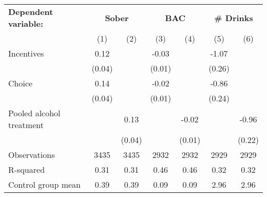 \begin{tabular}{l c c c c c c} \toprule \textbf{Dependent variable:} & \multicolumn{2}{c}{\textbf{Sober}} & \multicolumn{2}{c}{\textbf{BAC}} & \multicolumn{2}{c}{\textbf{\# Drinks}} \\ \cmidrule(lr){2-3} \cmidrule(lr){4-5} \cmidrule(lr){6-7}&\multicolumn{1}{c}{(1)}&\multicolumn{1}{c}{(2)}&\multicolumn{1}{c}{(3)}&\multicolumn{1}{c}{(4)}&\multicolumn{1}{c}{(5)}&\multicolumn{1}{c}{(6)}\\
\midrule
Incentives          &        0.12&            &       -0.03&            &       -1.07&            \\
                    &      (0.04)&            &      (0.01)&            &      (0.26)&            \\
\addlinespace
Choice              &        0.14&            &       -0.02&            &       -0.86&            \\
                    &      (0.04)&            &      (0.01)&            &      (0.24)&            \\
\addlinespace
Pooled alcohol treatment&            &        0.13&            &       -0.02&            &       -0.96\\
                    &            &      (0.04)&            &      (0.01)&            &      (0.22)\\
\midrule
Observations        &        3435&        3435&        2932&        2932&        2929&        2929\\
R-squared           &        0.31&        0.31&        0.46&        0.46&        0.32&        0.32\\
Control group mean  &        0.39&        0.39&        0.09&        0.09&        2.96&        2.96\\
\bottomrule \end{tabular} 